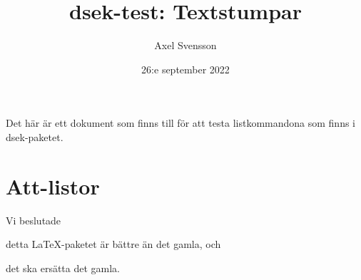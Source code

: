 \documentclass{article}
\title{\textsf{dsek}-test: Textstumpar}
\author{Axel Svensson}
\date{26:e september 2022}
\begin{document}
\maketitle

Det här är ett dokument som finns till för att testa listkommandona som finns i
\textsf{dsek}-paketet.

\section{Att-listor}
Vi beslutade
\begin{attlist}
\item detta \LaTeX-paketet är bättre än det gamla, och
\item det ska ersätta det gamla.
\end{attlist}
\end{document}
